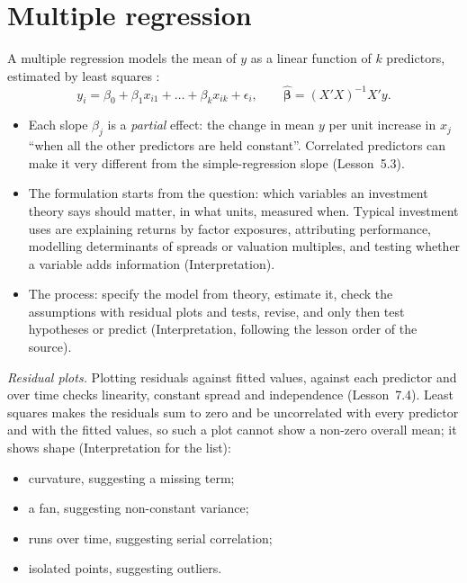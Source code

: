 \section{Multiple regression}

\begin{qfmethod}\label{meth:multiple-regression-formulation}
 A multiple regression models the mean of $y$ as a linear function of $k$ predictors, estimated by least squares \citep[Lessons~5.3--5.4]{regression-methods-course-notes}:
\[ y_i=\beta_0+\beta_1x_{i1}+\dots+\beta_kx_{ik}+\epsilon_i,\qquad \hat{\boldsymbol\beta}=(X'X)^{-1}X'y. \]
\begin{itemize}
\item Each slope $\beta_j$ is a \emph{partial} effect: the change in mean $y$ per unit increase in $x_j$ ``when all the other predictors are held constant''. Correlated predictors can make it very different from the simple-regression slope (Lesson~5.3).
\item The formulation starts from the question: which variables an investment theory says should matter, in what units, measured when. Typical investment uses are explaining returns by factor exposures, attributing performance, modelling determinants of spreads or valuation multiples, and testing whether a variable adds information (Interpretation).
\item The process: specify the model from theory, estimate it, check the assumptions with residual plots and tests, revise, and only then test hypotheses or predict (Interpretation, following the lesson order of the source).
\end{itemize}

\emph{Residual plots.} Plotting residuals against fitted values, against each predictor and over time checks linearity, constant spread and independence (Lesson~7.4). Least squares makes the residuals sum to zero and be uncorrelated with every predictor and with the fitted values, so such a plot cannot show a non-zero overall mean; it shows shape (Interpretation for the list):
\begin{itemize}
\item curvature, suggesting a missing term;
\item a fan, suggesting non-constant variance;
\item runs over time, suggesting serial correlation;
\item isolated points, suggesting outliers.
\end{itemize}


\end{qfmethod}
